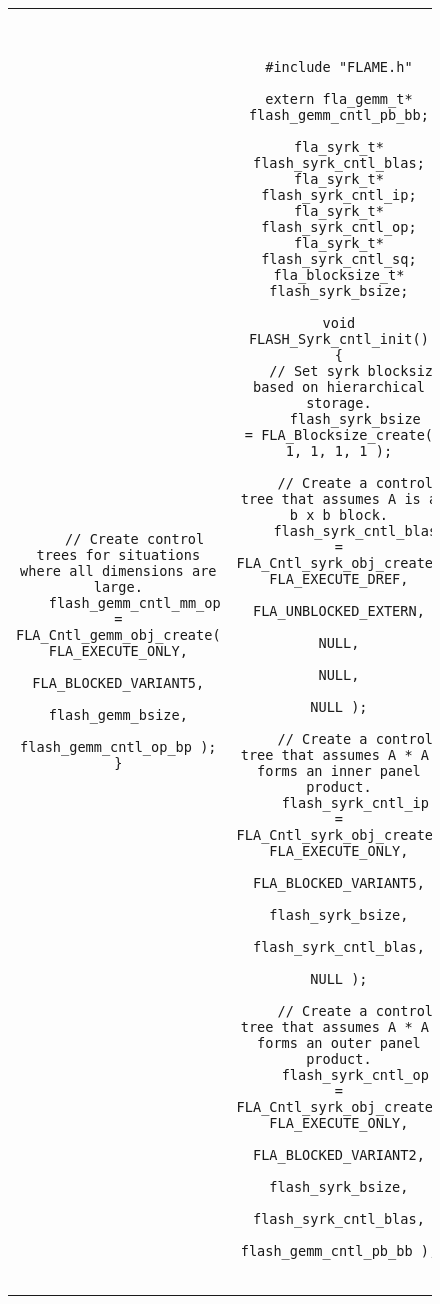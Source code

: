 \begin{figure}[tbp]
\begin{center}
\begin{tabular}{|c|c|}
\begin{minipage}[t]{3in}
{\begin{verbatim}
    // Create control trees for situations where all dimensions are large.
    flash_gemm_cntl_mm_op = FLA_Cntl_gemm_obj_create( FLA_EXECUTE_ONLY,
                                                      FLA_BLOCKED_VARIANT5,
                                                      flash_gemm_bsize,
                                                      flash_gemm_cntl_op_bp );
}
\end{verbatim}
}
\end{minipage}
&
\begin{minipage}[t]{3in}
{\tt \tiny
\begin{verbatim}
#include "FLAME.h"

extern fla_gemm_t* flash_gemm_cntl_pb_bb;

fla_syrk_t*        flash_syrk_cntl_blas;
fla_syrk_t*        flash_syrk_cntl_ip;
fla_syrk_t*        flash_syrk_cntl_op;
fla_syrk_t*        flash_syrk_cntl_sq;
fla_blocksize_t*   flash_syrk_bsize;

void FLASH_Syrk_cntl_init()
{
    // Set syrk blocksize based on hierarchical storage.
    flash_syrk_bsize      = FLA_Blocksize_create( 1, 1, 1, 1 );

    // Create a control tree that assumes A is a b x b block.
    flash_syrk_cntl_blas  = FLA_Cntl_syrk_obj_create( FLA_EXECUTE_DREF,
                                                      FLA_UNBLOCKED_EXTERN,
                                                      NULL,
                                                      NULL,
                                                      NULL );

    // Create a control tree that assumes A * A' forms an inner panel product.
    flash_syrk_cntl_ip    = FLA_Cntl_syrk_obj_create( FLA_EXECUTE_ONLY,
                                                      FLA_BLOCKED_VARIANT5,
                                                      flash_syrk_bsize,
                                                      flash_syrk_cntl_blas,
                                                      NULL );

    // Create a control tree that assumes A * A' forms an outer panel product.
    flash_syrk_cntl_op    = FLA_Cntl_syrk_obj_create( FLA_EXECUTE_ONLY,
                                                      FLA_BLOCKED_VARIANT2,
                                                      flash_syrk_bsize,
                                                      flash_syrk_cntl_blas,
                                                      flash_gemm_cntl_pb_bb );


\end{verbatim}}
\end{minipage}
\end{tabular}
\end{center}
\end{figure}
